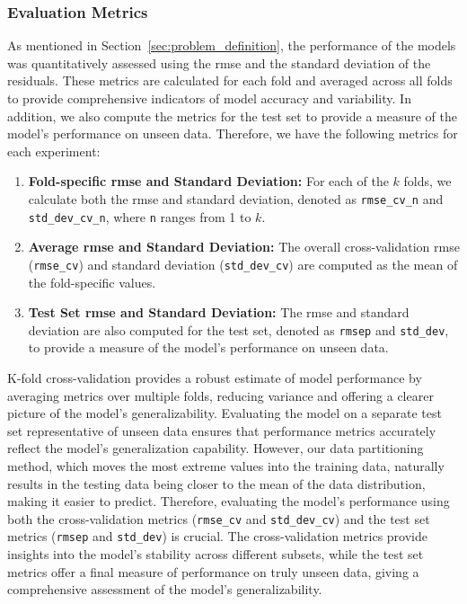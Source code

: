 \subsubsection{Evaluation Metrics}\label{subsubsec:evaluation_metrics}
As mentioned in Section~\ref{sec:problem_definition}, the performance of the models was quantitatively assessed using the \gls{rmse} and the standard deviation of the residuals.
These metrics are calculated for each fold and averaged across all folds to provide comprehensive indicators of model accuracy and variability.
In addition, we also compute the metrics for the test set to provide a measure of the model's performance on unseen data.
Therefore, we have the following metrics for each experiment:
\begin{enumerate}
    \item \textbf{Fold-specific \gls{rmse} and Standard Deviation:} For each of the $k$ folds, we calculate both the \gls{rmse} and standard deviation, denoted as \texttt{rmse\_cv\_n} and \texttt{std\_dev\_cv\_n}, where \texttt{n} ranges from 1 to $k$.
    \item \textbf{Average \gls{rmse} and Standard Deviation:} The overall cross-validation \gls{rmse} (\texttt{rmse\_cv}) and standard deviation (\texttt{std\_dev\_cv}) are computed as the mean of the fold-specific values.
    \item \textbf{Test Set \gls{rmse} and Standard Deviation:} The \gls{rmse} and standard deviation are also computed for the test set, denoted as \texttt{rmsep} and \texttt{std\_dev}, to provide a measure of the model's performance on unseen data.
\end{enumerate}

K-fold cross-validation provides a robust estimate of model performance by averaging metrics over multiple folds, reducing variance and offering a clearer picture of the model's generalizability.
Evaluating the model on a separate test set representative of unseen data ensures that performance metrics accurately reflect the model's generalization capability.
However, our data partitioning method, which moves the most extreme values into the training data, naturally results in the testing data being closer to the mean of the data distribution, making it easier to predict.
Therefore, evaluating the model's performance using both the cross-validation metrics (\texttt{rmse\_cv} and \texttt{std\_dev\_cv}) and the test set metrics (\texttt{rmsep} and \texttt{std\_dev}) is crucial.
The cross-validation metrics provide insights into the model's stability across different subsets, while the test set metrics offer a final measure of performance on truly unseen data, giving a comprehensive assessment of the model's generalizability.


